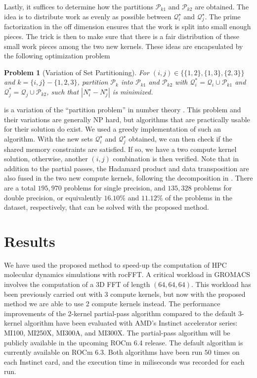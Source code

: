 \documentclass{gtac}
\theoremstyle{problemstyle}
\newtheorem{problem}{Problem}%
\begin{document}
Lastly, it suffices to determine how the partitions $\mathcal{P}_{k1}$ and $\mathcal{P}_{k2}$ are obtained. The idea is to distribute work as evenly as possible between $\mathcal{Q}_i^\star$ and $\mathcal{Q}_j^\star$. The prime factorization in the off dimension ensures that the work is split into small enough pieces. The trick is then to make sure that there is a fair distribution of these small work pieces among the two new kernels. These ideas are encapsulated by the following optimization problem
\begin{problem}[Variation of Set Partitioning]
For $(i,j) \in \bigl \{ \{1,2\}, \{1,3\}, \{2,3\} \bigr \}$ and $k = \{i,j\} - \{1,2,3\}$, partition $\mathcal{P}_k$ into $\mathcal{P}_{k1}$ and $\mathcal{P}_{k2}$ with $\mathcal{Q}_i^* = \mathcal{Q}_i \cup \mathcal{P}_{k1}$ and $\mathcal{Q}_j^* = \mathcal{Q}_j \cup \mathcal{P}_{k2}$, such that $| N_i^\star - N_j^\star |$ is minimized.
\label{prob:set_partitioning}
\end{problem}
 is a variation of the ``partition problem'' in number theory \cite{mertens03}. This problem and their variations are generally NP hard, but algorithms that are practically usable for their solution do exist. We used a greedy implementation of such an algorithm. With the new sets $\mathcal{Q}_i^\star$ and $\mathcal{Q}_j^\star$ obtained, we can then check if the shared memory constraints are satisfied. If so, we have a two compute kernel solution, otherwise, another $(i,j)$ combination is then verified. Note that in addition to the partial passes, the Hadamard product and data transposition are also fused in the two new compute kernels, following the decomposition in . There are a total $195,970$ problems for single precision, and $135,328$ problems for double precision, or equivalently $16.10\%$ and $11.12\%$ of the problems in the dataset, respectively, that can be solved with the proposed method.

\section{Results}
We have used the proposed method to speed-up the computation of HPC
molecular dynamics simulations with rocFFT. A critical workload in
GROMACS \cite{gromacs20} involves the computation of a
3D FFT of length $(64,64,64)$. This workload has
been previously carried out with 3 compute kernels, but now with
the proposed method we are able to use 2 compute kernels instead. The performance improvements of the 2-kernel partial-pass algorithm compared to the default 3-kernel algorithm have been evaluated with AMD's Instinct accelerator series: MI100, MI250X, MI300A, and MI300X. The partial-pass algorithm will be publicly available in the upcoming ROCm 6.4 release. The default algorithm is currently available on ROCm 6.3. Both algorithms have been run $50$ times on each Instinct card, and the execution time in miliseconds was recorded for each run. 
\end{document}
